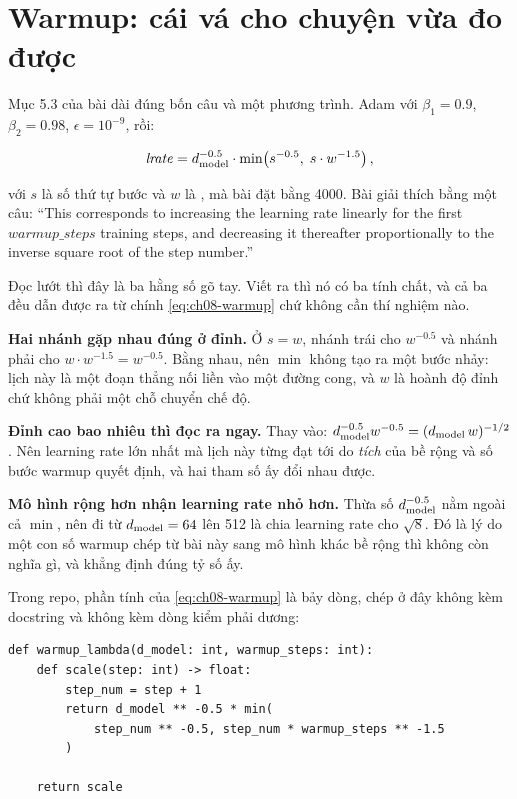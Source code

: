 \section{Warmup: cái vá cho chuyện vừa đo được}
\label{sec:ch08-warmup}

%
Mục 5.3 của bài dài đúng bốn câu và một phương trình. Adam với
\(\beta_1 = 0.9\), \(\beta_2 = 0.98\), \(\epsilon = 10^{-9}\), rồi:

\begin{equation}
  \mathit{lrate} = d_{\mathrm{model}}^{-0.5} \cdot
  \min\!\left( s^{-0.5},\; s \cdot w^{-1.5} \right),
  \label{eq:ch08-warmup}
\end{equation}

với \(s\) là số thứ tự bước và \(w\) là , mà bài đặt bằng
4000. Bài giải thích bằng một câu: \enquote{This corresponds to increasing the
learning rate linearly for the first \(warmup\_steps\) training steps, and
decreasing it thereafter proportionally to the inverse square root of the step
number.}

Đọc lướt thì đây là ba hằng số gõ tay. Viết ra thì nó có ba tính chất, và cả ba
đều dẫn được ra từ chính \eqref{eq:ch08-warmup} chứ không cần thí nghiệm nào.

%
\textbf{Hai nhánh gặp nhau đúng ở đỉnh.} Ở \(s = w\), nhánh trái cho
\(w^{-0.5}\) và nhánh phải cho \(w \cdot w^{-1.5} = w^{-0.5}\). Bằng nhau, nên
\(\min\) không tạo ra một bước nhảy: lịch này là một đoạn thẳng nối liền vào một
đường cong, và \(w\) là hoành độ đỉnh chứ không phải một chỗ chuyển chế độ.

\textbf{Đỉnh cao bao nhiêu thì đọc ra ngay.} Thay vào:
\(d_{\mathrm{model}}^{-0.5} w^{-0.5} = (d_{\mathrm{model}} \, w)^{-1/2}\). Nên learning rate lớn nhất
mà lịch này từng đạt tới do \emph{tích} của bề rộng và số bước warmup quyết
định, và hai tham số ấy đổi nhau được.

\textbf{Mô hình rộng hơn nhận learning rate nhỏ hơn.} Thừa số
\(d_{\mathrm{model}}^{-0.5}\) nằm ngoài cả \(\min\), nên đi từ \(d_{\mathrm{model}} = 64\) lên 512 là
chia learning rate cho \(\sqrt{8}\). Đó là lý do một con số warmup chép từ bài
này sang mô hình khác bề rộng thì không còn nghĩa gì, và
 khẳng định đúng tỷ số ấy.

Trong repo, phần tính của \eqref{eq:ch08-warmup} là bảy dòng, chép ở đây không
kèm docstring và không kèm dòng kiểm  phải dương:

\begin{verbatim}
def warmup_lambda(d_model: int, warmup_steps: int):
    def scale(step: int) -> float:
        step_num = step + 1
        return d_model ** -0.5 * min(
            step_num ** -0.5, step_num * warmup_steps ** -1.5
        )

    return scale
\end{verbatim}

